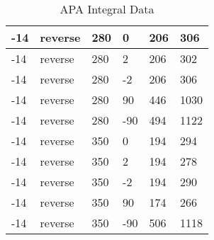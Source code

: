 \begin{table}
\begin{center}
\begin{tabular}{|l|l|l|l|l|l|}
			\hline
			-14 & reverse & 280 & 0 & 206 & 306 \\
			\hline
			-14 & reverse & 280 & 2 & 206 & 302 \\
			\hline
			-14 & reverse & 280 & -2 & 206 & 306 \\
			\hline
			-14 & reverse & 280 & 90 & 446 & 1030 \\
			\hline
			-14 & reverse & 280 & -90 & 494 & 1122 \\
			\hline
			-14 & reverse & 350 & 0 & 194 & 294 \\
			\hline
			-14 & reverse & 350 & 2 & 194 & 278 \\
			\hline
			-14 & reverse & 350 & -2 & 194 & 290 \\
			\hline
			-14 & reverse & 350 & 90 & 174 & 266 \\
			\hline
			-14 & reverse & 350 & -90 & 506 & 1118 \\
			\hline
		\end{tabular}
	\end{center}
	\caption{APA Integral Data}
	\label{tab:apa_sum}
\end{table}